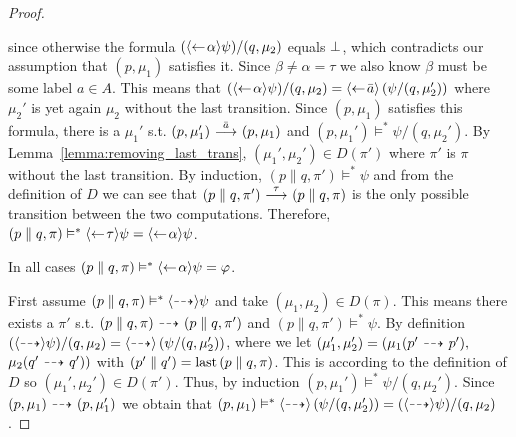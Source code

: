 \begin{proof}
\begin{itemize}
            since otherwise the formula $(\mbox{\ensuremath{\langle\leftarrow\! \alpha \rangle}}\psi)/(q,\mu_2)$
            equals $\bot$, which contradicts our assumption
            that $(p,\mu_1)$ satisfies it. Since $\beta\ne\alpha = \tau$ we also know $\beta$
            must be some label $a\in A$. This means that $(\mbox{\ensuremath{\langle\leftarrow\! \alpha \rangle}}\psi)/(q,\mu_2)
            = \mbox{\ensuremath{\langle\leftarrow\! \bar{a} \rangle}} \left( \psi / (q, \mu_2') \right)$ where $\mu_2'$ is yet
            again $\mu_2$ without the last transition. Since $(p,\mu_1)$ satisfies this formula,
            there is a $\mu_1'$ s.t. $(p,\mu_1')\ {\stackrel{{\bar{a}}}{\longrightarrow}}\ (p,\mu_1)$ and $(p,\mu_1')
            \vDash^* \psi/(q,\mu_2')$. By
            Lemma~\ref{lemma:removing_last_trans}, $(\mu_1',\mu_2')\in D(\pi')$ where
            $\pi'$ is $\pi$ without the last transition. By induction, $(p\parallel q, \pi')
            \vDash^* \psi$ and from the definition of $D$ we can see that $(p\parallel q,\pi')
            \ {\stackrel{{\tau}}{\longrightarrow}}\  (p\parallel q,\pi)$ is the only possible transition between the
            two computations. Therefore,
            $(p\parallel q,\pi) \vDash^* \mbox{\ensuremath{\langle\leftarrow\! \tau \rangle}} \psi
            = \mbox{\ensuremath{\langle\leftarrow\! \alpha \rangle}}\psi$.
    \end{itemize}
    In all cases $(p\parallel q,\pi) \vDash^* \mbox{\ensuremath{\langle\leftarrow\! \alpha \rangle}}\psi = \varphi$.



    \par\nobreak
    \ltr First assume $(p\parallel q, \pi) \vDash^* \mbox{\ensuremath{\langle\stackrel{_{}}{\dashrightarrow}\rangle}}\psi$ and take $(\mu_1,\mu_2)
    \in D(\pi)$. This means there exists
    a $\pi'$ s.t. $(p\parallel q, \pi) \ {\stackrel{_{}}{\dashrightarrow}}\  (p\parallel q, \pi')$ and $(p\parallel q,
    \pi')\vDash^* \psi$. By definition
    $(\mbox{\ensuremath{\langle\stackrel{_{}}{\dashrightarrow}\rangle}}\psi)/(q,\mu_2) = \mbox{\ensuremath{\langle\stackrel{_{}}{\dashrightarrow}\rangle}} \left( \psi / (q, \mu_2') \right)$,
    where we let $(\mu_1',
    \mu_2') = (\mu_1(p'\ {\stackrel{_{}}{\dashrightarrow}}\ p'),$ $\mu_2(q'\ {\stackrel{_{}}{\dashrightarrow}}\ q'))$ with $(p' \parallel q') =
    \operatorname{last}{(p\parallel q, \pi)}$. This is according to the definition of $D$ so $(\mu_1',\mu_2')
    \in D(\pi')$. Thus, by induction $(p,\mu_1') \vDash^* \psi / (q,\mu_2')$. Since $(p,\mu_1)
    \ {\stackrel{_{}}{\dashrightarrow}}\  (p,\mu_1')$ we obtain that $(p,\mu_1) \vDash^* \mbox{\ensuremath{\langle\stackrel{_{}}{\dashrightarrow}\rangle}} \left(
    \psi / (q,\mu_2') \right) = (\mbox{\ensuremath{\langle\stackrel{_{}}{\dashrightarrow}\rangle}}\psi)/(q,\mu_2)$.


\end{proof}
